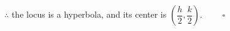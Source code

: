 \documentclass{report}
\newcommand{\eos}{ \qquad \square}
\begin{document}
\begin{enumerate}[leftmargin=*]
\begin{enumerate}
                    $\therefore$ the locus is a hyperbola, and its center is $\left(\dfrac{h}{2}, \dfrac{k}{2}\right)$. $\eos$

          \end{enumerate}

\end{enumerate}
\end{document}
